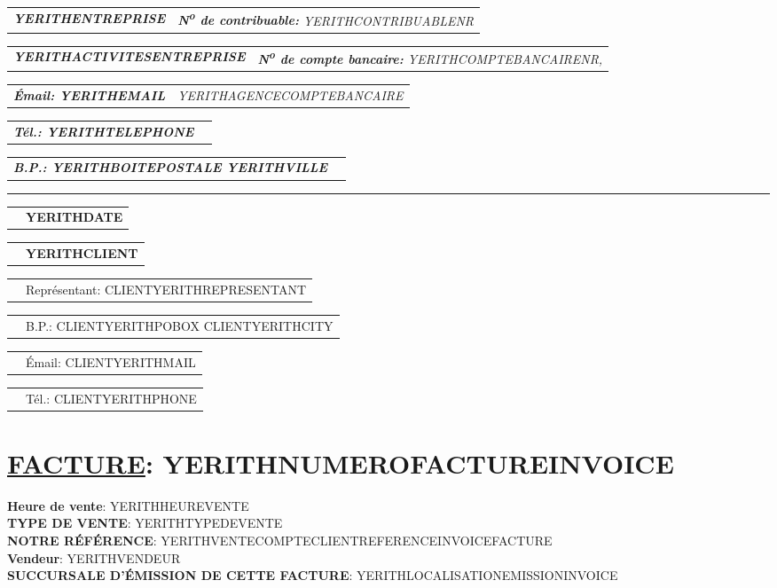 \documentclass[10pt,YERITHPAPERSPEC]{article} %
\makeatletter
\newcommand{\headerrow}[2]
{\begin{tabular*}{\linewidth}{l@{\extracolsep{\fill}}r}
	#1 &
	#2 \\
\end{tabular*}}
\newcommand{\emphbold}[1]{\textbf{\emph{#1}}\xspace}
\makeatother
\begin{document}
\bigskip

\headerrow
	{\emphbold{YERITHENTREPRISE}}
	{\emph{\textbf{N\textsuperscript{o} de contribuable:} YERITHCONTRIBUABLENR}}
\headerrow
	{\emphbold{YERITHACTIVITESENTREPRISE}}
	{\emph{\textbf{N\textsuperscript{o} de compte bancaire:} YERITHCOMPTEBANCAIRENR,}}
\headerrow
	{\emphbold{\'Email: YERITHEMAIL}}
	{\emph{YERITHAGENCECOMPTEBANCAIRE}}
\headerrow
	{\emphbold{T\'el.: YERITHTELEPHONE}}
	{}
\headerrow
	{\emphbold{B.P.: YERITHBOITEPOSTALE YERITHVILLE}}
	{}
	
\hrule

\headerrow
	{}
	{\textbf{YERITHDATE}}

\vspace*{0.9cm}

\headerrow
{}
{\textbf{YERITHCLIENT}}
\headerrow
{}
{Repr\'esentant: CLIENTYERITHREPRESENTANT}
\headerrow
{}
{B.P.: CLIENTYERITHPOBOX CLIENTYERITHCITY}
\headerrow
{}
{\'Email: CLIENTYERITHMAIL}
\headerrow
{}
{T\'el.: CLIENTYERITHPHONE}

\section*{\underline{FACTURE}: YERITHNUMEROFACTUREINVOICE}
\textbf{Heure de vente}: YERITHHEUREVENTE\\
\textbf{TYPE DE VENTE}: YERITHTYPEDEVENTE\\
\textbf{NOTRE RÉFÉRENCE}: YERITHVENTECOMPTECLIENTREFERENCEINVOICEFACTURE\\
\textbf{Vendeur}: YERITHVENDEUR\\
\textbf{SUCCURSALE D'ÉMISSION DE CETTE FACTURE}: YERITHLOCALISATIONEMISSIONINVOICE

\vspace{0.3cm} 

\begin{table*}[!htbp]
\end{table*}
\end{document}
